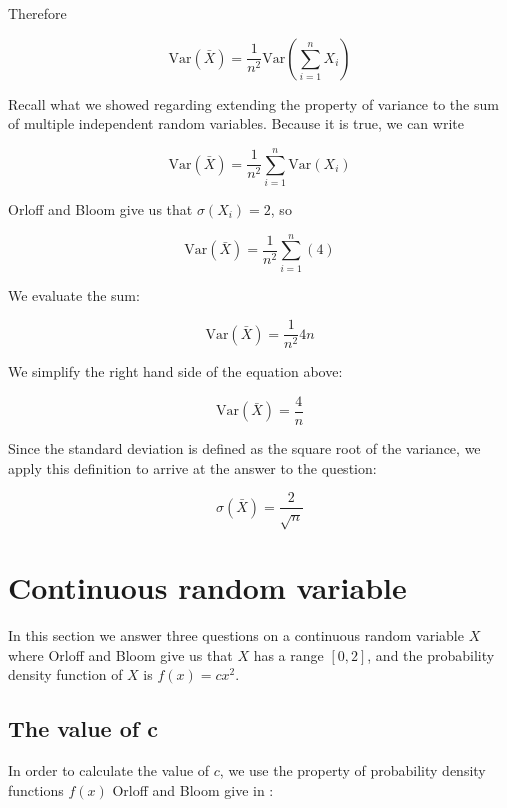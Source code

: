 \documentclass[a4paper,11pt]{article}
\begin{document}
Therefore

\begin{equation}
\text{Var}\left( \bar{X} \right)
  = \frac{1}{n^{2}} \text{Var} \left( \sum_{i=1}^{n} X_{i} \right)
\end{equation}

Recall what we showed regarding extending the property of variance to the sum
of multiple independent random variables. Because it is true, we can write

\begin{equation}
\text{Var}\left( \bar{X} \right)
  = \frac{1}{n^{2}} \sum_{i=1}^{n} \text{Var} \left( X_{i} \right)
\end{equation}

Orloff and Bloom give us that $\sigma(X_{i})=2$, so

\begin{equation}
\text{Var}\left( \bar{X} \right)
  = \frac{1}{n^{2}} \sum_{i=1}^{n} \left( 4 \right)
\end{equation}

We evaluate the sum:

\begin{equation}
\text{Var}\left( \bar{X} \right)
  = \frac{1}{n^{2}} 4n
\end{equation}

We simplify the right hand side of the equation above:

\begin{equation}
\text{Var}\left( \bar{X} \right)
  =  \frac{4}{n}
\end{equation}

Since the standard deviation is defined as the square root of the variance, we
apply this definition to arrive at the answer to the question:

\begin{equation}
\sigma \left( \bar{X} \right)
  =  \frac{2}{\sqrt{n}}
\end{equation}

\section{Continuous random variable}
In this section we answer three questions on a continuous random variable $X$
where Orloff and Bloom give us that $X$ has a range $\left[ 0, 2 \right]$, and
the probability density function of $X$ is $f \left( x \right) = cx^{2}$.

\subsection{The value of c}
In order to calculate the value of $c$, we use the property of probability
density functions $f\left(x \right)$ Orloff and Bloom give in \cite{reading5b}:
\end{document}
